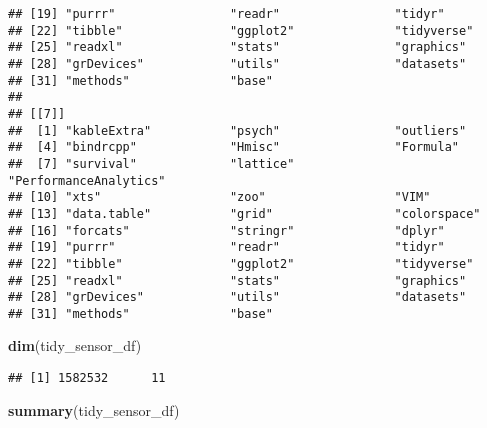 \documentclass[]{article}
\newenvironment{Shaded}{\begin{snugshade}}{\end{snugshade}}
\newcommand{\KeywordTok}[1]{\textcolor[rgb]{0.13,0.29,0.53}{\textbf{#1}}}
\newcommand{\NormalTok}[1]{#1}
\begin{document}
\begin{verbatim}
## [19] "purrr"                "readr"                "tidyr"               
## [22] "tibble"               "ggplot2"              "tidyverse"           
## [25] "readxl"               "stats"                "graphics"            
## [28] "grDevices"            "utils"                "datasets"            
## [31] "methods"              "base"                
## 
## [[7]]
##  [1] "kableExtra"           "psych"                "outliers"            
##  [4] "bindrcpp"             "Hmisc"                "Formula"             
##  [7] "survival"             "lattice"              "PerformanceAnalytics"
## [10] "xts"                  "zoo"                  "VIM"                 
## [13] "data.table"           "grid"                 "colorspace"          
## [16] "forcats"              "stringr"              "dplyr"               
## [19] "purrr"                "readr"                "tidyr"               
## [22] "tibble"               "ggplot2"              "tidyverse"           
## [25] "readxl"               "stats"                "graphics"            
## [28] "grDevices"            "utils"                "datasets"            
## [31] "methods"              "base"
\end{verbatim}

\begin{Shaded}
\begin{Highlighting}[]
\KeywordTok{dim}\NormalTok{(tidy_sensor_df)}
\end{Highlighting}
\end{Shaded}

\begin{verbatim}
## [1] 1582532      11
\end{verbatim}

\begin{Shaded}
\begin{Highlighting}[]
\KeywordTok{summary}\NormalTok{(tidy_sensor_df)}
\end{Highlighting}
\end{Shaded}
\end{document}
